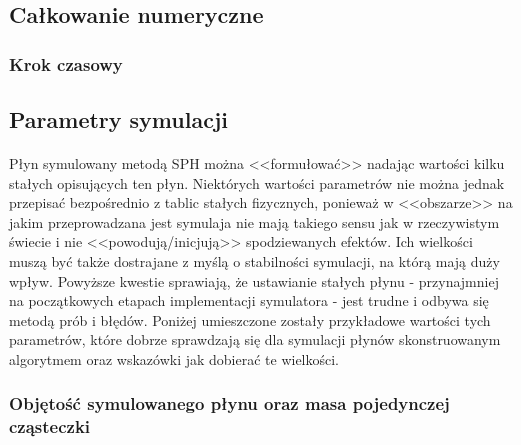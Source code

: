 \subsection{Całkowanie numeryczne}

\paragraph{}

\par

\subsubsection{Krok czasowy}

\paragraph{}

\par

\subsection{Parametry symulacji}

\paragraph{}
Płyn symulowany metodą SPH można <<formułować>> nadając wartości kilku stałych opisujących ten płyn. Niektórych wartości parametrów nie można jednak przepisać bezpośrednio z tablic stałych fizycznych, ponieważ w <<obszarze>> na jakim przeprowadzana jest symulaja nie mają takiego sensu jak w rzeczywistym świecie i nie <<powodują/inicjują>> spodziewanych efektów. Ich wielkości muszą być także dostrajane z myślą o stabilności symulacji, na którą mają duży wpływ. Powyższe kwestie sprawiają, że ustawianie stałych płynu - przynajmniej na początkowych etapach implementacji symulatora - jest trudne i odbywa się metodą prób i błędów. Poniżej umieszczone zostały przykładowe wartości tych parametrów, które dobrze sprawdzają się dla symulacji płynów skonstruowanym algorytmem oraz wskazówki jak dobierać te wielkości.
\par

\subsubsection{Objętość symulowanego płynu oraz masa pojedynczej cząsteczki}

